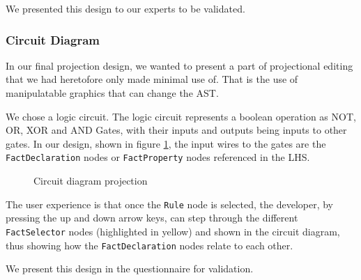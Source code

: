 We presented this design to our experts to be validated.

\subsubsection{Circuit Diagram}
In our final projection design, we wanted to present a part of projectional editing that we had heretofore only made minimal use of.
That is the use of manipulatable graphics that can change the AST.

We chose a logic circuit. 
The logic circuit represents a boolean operation as NOT, OR, XOR and AND Gates, with their inputs and outputs being inputs to other gates.
In our design, shown in figure \ref{fig:CircuitDiagramProjection}, the input wires to the gates are the \texttt{FactDeclaration} nodes or \texttt{FactProperty} nodes referenced in the LHS.

\begin{figure}[h]
    \centering
    \caption{Circuit diagram projection}
    \label{fig:CircuitDiagramProjection}
\end{figure}

The user experience is that once the \texttt{Rule} node is selected, the developer, by pressing the up and down arrow keys, can step through the different \texttt{FactSelector} nodes (highlighted in yellow) and shown in the circuit diagram, thus showing how the \texttt{FactDeclaration} nodes relate to each other.

We present this design in the questionnaire for validation.

